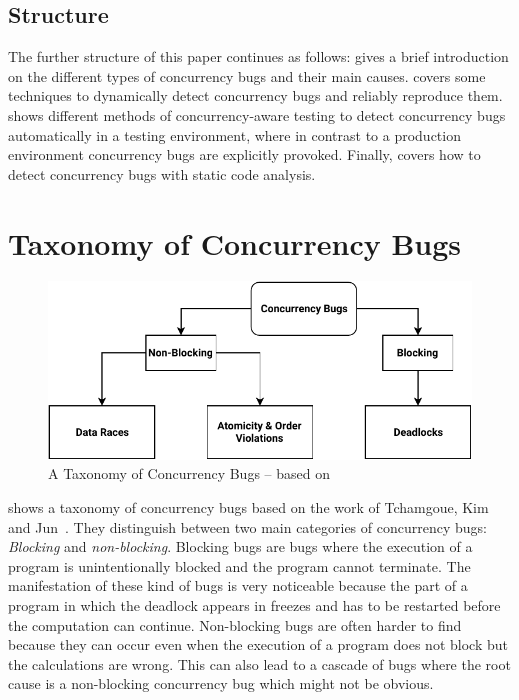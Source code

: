 \documentclass[english]{lni}
\begin{document}
\subsection{Structure}

The further structure of this paper continues as follows:
 gives a brief introduction on the different types of concurrency bugs and their main causes.
 covers some techniques to dynamically detect concurrency bugs and reliably reproduce them.
 shows different methods of concurrency-aware testing to detect concurrency bugs automatically in a testing environment, where in contrast to a production environment concurrency bugs are explicitly provoked.
Finally,  covers how to detect concurrency bugs with static code analysis.


\section{Taxonomy of Concurrency Bugs}
\label{sct:taxonomy}

\begin{figure}
    \centering
    \includegraphics[width=0.7\linewidth]{figures/ConcurrencyBugClasses.pdf}
    \caption{A Taxonomy of Concurrency Bugs -- based on\cite{tchamgoue2012testing}}
    \label{fig:classes}
\end{figure}

 shows a taxonomy of concurrency bugs based on the work of Tchamgoue, Kim and Jun~\cite{tchamgoue2012testing}.
They distinguish between two main categories of concurrency bugs: \emph{Blocking} and \emph{non-blocking}.
Blocking bugs are bugs where the execution of a program is unintentionally blocked and the program cannot terminate.
The manifestation of these kind of bugs is very noticeable because the part of a program in which the deadlock appears in freezes and has to be restarted before the computation can continue.
Non-blocking bugs are often harder to find because they can occur even when the execution of a program does not block but the calculations are wrong.
This can also lead to a cascade of bugs where the root cause is a non-blocking concurrency bug which might not be obvious.
\end{document}
